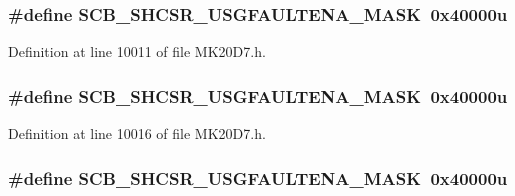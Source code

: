 \subsubsection[{\texorpdfstring{S\+C\+B\+\_\+\+S\+H\+C\+S\+R\+\_\+\+U\+S\+G\+F\+A\+U\+L\+T\+E\+N\+A\+\_\+\+M\+A\+SK}{SCB_SHCSR_USGFAULTENA_MASK}}]{\setlength{\rightskip}{0pt plus 5cm}\#define S\+C\+B\+\_\+\+S\+H\+C\+S\+R\+\_\+\+U\+S\+G\+F\+A\+U\+L\+T\+E\+N\+A\+\_\+\+M\+A\+SK~0x40000u}\hypertarget{group___s_c_b___register___masks_ga9ef5790c8bd898e33f9912f71f488057}{}\label{group___s_c_b___register___masks_ga9ef5790c8bd898e33f9912f71f488057}


Definition at line 10011 of file M\+K20\+D7.\+h.

\subsubsection[{\texorpdfstring{S\+C\+B\+\_\+\+S\+H\+C\+S\+R\+\_\+\+U\+S\+G\+F\+A\+U\+L\+T\+E\+N\+A\+\_\+\+M\+A\+SK}{SCB_SHCSR_USGFAULTENA_MASK}}]{\setlength{\rightskip}{0pt plus 5cm}\#define S\+C\+B\+\_\+\+S\+H\+C\+S\+R\+\_\+\+U\+S\+G\+F\+A\+U\+L\+T\+E\+N\+A\+\_\+\+M\+A\+SK~0x40000u}\hypertarget{group___s_c_b___register___masks_ga9ef5790c8bd898e33f9912f71f488057}{}\label{group___s_c_b___register___masks_ga9ef5790c8bd898e33f9912f71f488057}


Definition at line 10016 of file M\+K20\+D7.\+h.

\subsubsection[{\texorpdfstring{S\+C\+B\+\_\+\+S\+H\+C\+S\+R\+\_\+\+U\+S\+G\+F\+A\+U\+L\+T\+E\+N\+A\+\_\+\+M\+A\+SK}{SCB_SHCSR_USGFAULTENA_MASK}}]{\setlength{\rightskip}{0pt plus 5cm}\#define S\+C\+B\+\_\+\+S\+H\+C\+S\+R\+\_\+\+U\+S\+G\+F\+A\+U\+L\+T\+E\+N\+A\+\_\+\+M\+A\+SK~0x40000u}\hypertarget{group___s_c_b___register___masks_ga9ef5790c8bd898e33f9912f71f488057}{}\label{group___s_c_b___register___masks_ga9ef5790c8bd898e33f9912f71f488057}


